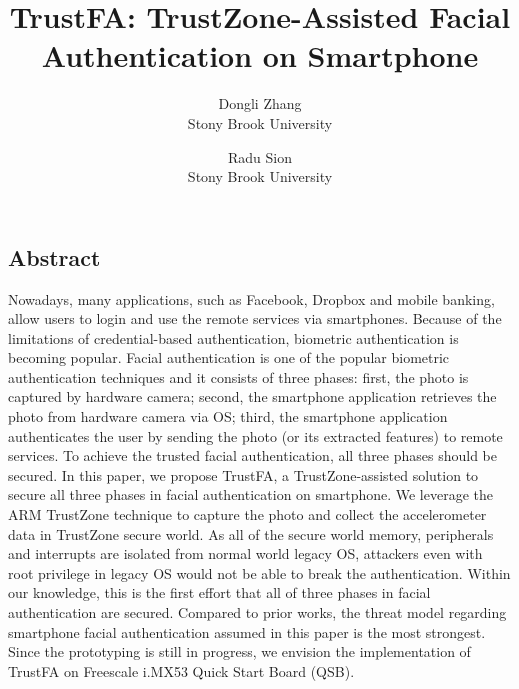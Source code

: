 \documentclass[letterpaper,twocolumn,10pt]{article}
\begin{document}
\date{}

\title{\Large \bf TrustFA: TrustZone-Assisted Facial Authentication on Smartphone}

\author{
{\rm Dongli Zhang}\\
Stony Brook University
\and
{\rm Radu Sion}\\
Stony Brook University
} %

\maketitle

\thispagestyle{empty}


\subsection*{Abstract}

Nowadays, many applications, such as Facebook, Dropbox and mobile banking,
allow users to login and use the remote services via smartphones. Because of
the limitations of credential-based authentication, biometric authentication is
becoming popular. Facial authentication is one of the popular biometric
authentication techniques and it consists of three phases: first, the photo is
captured by hardware camera; second, the smartphone application retrieves the
photo from hardware camera via OS; third, the smartphone application
authenticates the user by sending the photo (or its extracted features) to
remote services.  To achieve the trusted facial authentication, all three
phases should be secured.  In this paper, we propose TrustFA, a
TrustZone-assisted solution to secure all three phases in facial authentication
on smartphone.  We leverage the ARM TrustZone technique to capture the photo
and collect the accelerometer data in TrustZone secure world.  As all of the
secure world memory, peripherals and interrupts are isolated from normal world
legacy OS, attackers even with root privilege in legacy OS would not be able to
break the authentication. Within our knowledge, this is the first effort that
all of three phases in facial authentication are secured. Compared to prior
works, the threat model regarding smartphone facial authentication assumed in
this paper is the most strongest.  Since the prototyping is still in progress,
we envision the implementation of TrustFA on Freescale i.MX53 Quick Start Board
(QSB).
\end{document}
